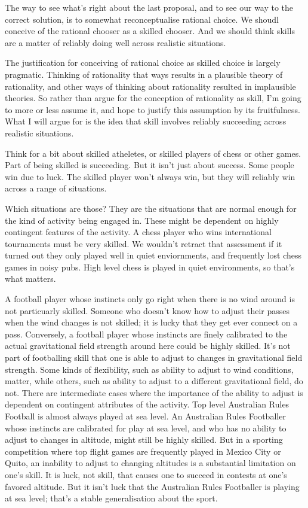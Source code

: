 \documentclass[
  11pt,
  letterpaper,
  DIV=11,
  numbers=noendperiod,
  oneside]{scrartcl}
\begin{document}
The way to see what's right about the last proposal, and to see our way
to the correct solution, is to somewhat reconceptualise rational choice.
We shoudl conceive of the rational chooser as a skilled chooser. And we
should think skills are a matter of reliably doing well across realistic
situations.

The justification for conceiving of rational choice as skilled choice is
largely pragmatic. Thinking of rationality that ways results in a
plausible theory of rationality, and other ways of thinking about
rationality resulted in implausible theories. So rather than argue for
the conception of rationality as skill, I'm going to more or less assume
it, and hope to justify this assumption by its fruitfulness. What I will
argue for is the idea that skill involves reliably succeeding across
realistic situations.

Think for a bit about skilled atheletes, or skilled players of chess or
other games. Part of being skilled is succeeding. But it isn't just
about success. Some people win due to luck. The skilled player won't
always win, but they will reliably win across a range of situations.

Which situations are those? They are the situations that are normal
enough for the kind of activity being engaged in. These might be
dependent on highly contingent features of the activity. A chess player
who wins international tournaments must be very skilled. We wouldn't
retract that assessment if it turned out they only played well in quiet
enviornments, and frequently lost chess games in noisy pubs. High level
chess is played in quiet environments, so that's what matters.

A football player whose instincts only go right when there is no wind
around is not particuarly skilled. Someone who doesn't know how to
adjust their passes when the wind changes is not skilled; it is lucky
that they get ever connect on a pass. Conversely, a football player
whose instincts are finely calibrated to the actual gravitational field
strength around here could be highly skilled. It's not part of
footballing skill that one is able to adjust to changes in gravitational
field strength. Some kinds of flexibility, such as ability to adjust to
wind conditions, matter, while others, such as ability to adjust to a
different gravitational field, do not. There are intermediate cases
where the importance of the ability to adjust is dependent on contingent
attributes of the activity. Top level Australian Rules Football is
almost always played at sea level. An Australian Rules Footballer whose
instincts are calibrated for play at sea level, and who has no ability
to adjust to changes in altitude, might still be highly skilled. But in
a sporting competition where top flight games are frequently played in
Mexico City or Quito, an inability to adjust to changing altitudes is a
substantial limitation on one's skill. It is luck, not skill, that
causes one to succeed in contests at one's favored altitude. But it
isn't luck that the Australian Rules Footballer is playing at sea level;
that's a stable generalisation about the sport.
\end{document}
